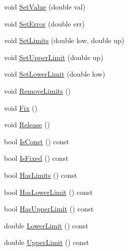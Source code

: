 \begin{DoxyCompactItemize}
\item 
void \mbox{\hyperlink{classROOT_1_1Minuit2_1_1MinuitParameter_a535d59656c70ba8a0cc0ff196bac2d93}{Set\+Value}} (double val)
\item 
void \mbox{\hyperlink{classROOT_1_1Minuit2_1_1MinuitParameter_affa3dbe5755e6345181b98d168722a60}{Set\+Error}} (double err)
\item 
void \mbox{\hyperlink{classROOT_1_1Minuit2_1_1MinuitParameter_aeb1a61d3c007780ec388e11dd39274fc}{Set\+Limits}} (double low, double up)
\item 
void \mbox{\hyperlink{classROOT_1_1Minuit2_1_1MinuitParameter_a9e0c6225558635b19b5d10d0c6d9bb86}{Set\+Upper\+Limit}} (double up)
\item 
void \mbox{\hyperlink{classROOT_1_1Minuit2_1_1MinuitParameter_abf4e64af27e615b90fff7a21e2831488}{Set\+Lower\+Limit}} (double low)
\item 
void \mbox{\hyperlink{classROOT_1_1Minuit2_1_1MinuitParameter_a8c120aa76754c8c8209d0a8c78605137}{Remove\+Limits}} ()
\item 
void \mbox{\hyperlink{classROOT_1_1Minuit2_1_1MinuitParameter_ad0857ffbf012d785401c111cacc79085}{Fix}} ()
\item 
void \mbox{\hyperlink{classROOT_1_1Minuit2_1_1MinuitParameter_a9bf4bb232de53b61fc264c62b44d0b27}{Release}} ()
\item 
bool \mbox{\hyperlink{classROOT_1_1Minuit2_1_1MinuitParameter_afa82fc56a19c43531f469efc1fa34c2c}{Is\+Const}} () const
\item 
bool \mbox{\hyperlink{classROOT_1_1Minuit2_1_1MinuitParameter_a2d7f48ed0d6d1ac124e390e54df4de32}{Is\+Fixed}} () const
\item 
bool \mbox{\hyperlink{classROOT_1_1Minuit2_1_1MinuitParameter_a6319fe000027da162c4adad8782ef27b}{Has\+Limits}} () const
\item 
bool \mbox{\hyperlink{classROOT_1_1Minuit2_1_1MinuitParameter_a61b9c27aff1b1d7bf85bed898dd50dda}{Has\+Lower\+Limit}} () const
\item 
bool \mbox{\hyperlink{classROOT_1_1Minuit2_1_1MinuitParameter_a821e242fbbf23461e3b66a59126f3f02}{Has\+Upper\+Limit}} () const
\item 
double \mbox{\hyperlink{classROOT_1_1Minuit2_1_1MinuitParameter_a25c7f30fc42264f1df96a3852d2e11a4}{Lower\+Limit}} () const
\item 
double \mbox{\hyperlink{classROOT_1_1Minuit2_1_1MinuitParameter_a285e254a9574807222d2a74bb05e18d9}{Upper\+Limit}} () const
\end{DoxyCompactItemize}


